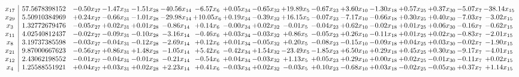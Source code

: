 \documentclass[9pt]{article}
\begin{document}
 \[\begin{array}{c| c c@{\hskip 2pt} c@{\hskip 2pt} c@{\hskip 2pt} c@{\hskip 2pt} c@{\hskip 2pt} c@{\hskip 2pt} c@{\hskip 2pt} c@{\hskip 2pt} c@{\hskip 2pt} c@{\hskip 2pt} c@{\hskip 2pt} c@{\hskip 2pt} c@{\hskip 2pt} c@{\hskip 2pt} c@{\hskip 2pt} }
 x_{17}   &  57.5678398152 & -0.50 x_{27} & -1.47 x_{31} & -1.51 x_{28} & -40.56 x_{14} & -6.57 x_{6} & +  0.05 x_{34} & -0.65 x_{32} & + 19.89 x_{5} & -0.67 x_{23} & +  3.60 x_{10} & -1.30 x_{18} & +  0.57 x_{25} & +  0.37 x_{30} & -5.07 x_{7} & -38.14 x_{15}\\
 x_{29}   &  5.50910384969 & +  0.24 x_{27} & -0.66 x_{31} & -1.01 x_{28} & -29.98 x_{14} & + 10.05 x_{6} & +  0.19 x_{34} & -0.39 x_{32} & + 16.15 x_{5} & -0.07 x_{23} & -7.17 x_{10} & -0.66 x_{18} & +  0.30 x_{25} & +  0.40 x_{30} & -7.03 x_{7} & -3.02 x_{15}\\
 x_{3}   &  1.32772679476 & -0.05 x_{27} & +  0.02 x_{31} & +  0.01 x_{28} & -0.86 x_{14} & +  0.14 x_{6} & -0.00 x_{34} & +  0.02 x_{32} & -0.01 x_{5} & -0.04 x_{23} & +  0.62 x_{10} & -0.02 x_{18} & +  0.01 x_{25} & +  0.06 x_{30} & -0.16 x_{7} & -0.62 x_{15}\\
 x_{11}   &  4.02540812437 & -0.02 x_{27} & -0.09 x_{31} & -0.10 x_{28} & -3.16 x_{14} & -0.46 x_{6} & +  0.03 x_{34} & -0.03 x_{32} & +  0.86 x_{5} & -0.05 x_{23} & +  0.26 x_{10} & -0.11 x_{18} & +  0.01 x_{25} & +  0.02 x_{30} & -0.83 x_{7} & -2.01 x_{15}\\
 x_{8}   &  3.19737385598 & -0.03 x_{27} & -0.04 x_{31} & -0.12 x_{28} & -2.69 x_{14} & +  0.12 x_{6} & +  0.01 x_{34} & -0.05 x_{32} & +  0.20 x_{5} & -0.08 x_{23} & -0.15 x_{10} & -0.09 x_{18} & +  0.04 x_{25} & +  0.03 x_{30} & -0.02 x_{7} & -1.90 x_{15}\\
 x_{21}   &  9.87000667623 & -0.56 x_{27} & +  0.86 x_{31} & +  1.48 x_{28} & -1.05 x_{14} & +  5.42 x_{6} & -0.42 x_{34} & +  1.54 x_{32} & -23.49 x_{5} & -1.85 x_{23} & +  6.50 x_{10} & +  0.29 x_{18} & +  0.45 x_{25} & +  0.30 x_{30} & -9.17 x_{7} & -4.01 x_{15}\\
 x_{12}   &  2.43062198552 & -0.01 x_{27} & -0.04 x_{31} & -0.01 x_{28} & -0.21 x_{14} & -0.54 x_{6} & +  0.04 x_{34} & -0.03 x_{32} & +  1.13 x_{5} & +  0.05 x_{23} & +  0.29 x_{10} & +  0.00 x_{18} & +  0.02 x_{25} & -0.01 x_{30} & -0.11 x_{7} & +  0.02 x_{15}\\
 x_{4}   &  1.25588551921 & +  0.04 x_{27} & +  0.03 x_{31} & +  0.02 x_{28} & +  2.23 x_{14} & +  0.41 x_{6} & -0.03 x_{34} & +  0.02 x_{32} & -0.03 x_{5} & +  0.10 x_{23} & -0.68 x_{10} & +  0.03 x_{18} & -0.02 x_{25} & -0.05 x_{30} & +  0.37 x_{7} & +  1.14 x_{15}\\

\end{array}\]
\end{document}
